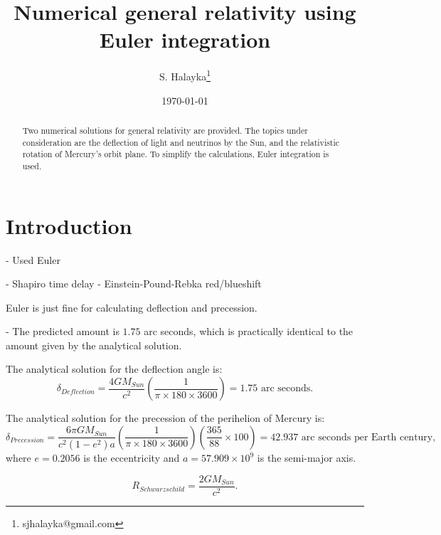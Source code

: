 \documentclass[12pt]{article}
\title{Numerical general relativity using Euler integration}
\author{S. Halayka\footnote{sjhalayka@gmail.com}}
\date{\today\;\currenttime}
\begin{document}
 
\maketitle

\begin{abstract}
Two numerical solutions for general relativity are provided.
The topics under consideration are the deflection of light and neutrinos by the Sun, and the relativistic rotation of Mercury's orbit plane.
To simplify the calculations, Euler integration is used.
\end{abstract}





\section{Introduction}

- Used Euler

- Shapiro time delay
- Einstein-Pound-Rebka red/blueshift







Euler is just fine for calculating deflection and precession.




- The predicted amount is $1.75$ arc seconds, which is practically identical to the amount given by the analytical solution.




The analytical solution for the deflection angle is:
\begin{equation}
\delta_{Deflection} = \frac{4GM_{Sun}}{c^2} \left( \frac{1}{\pi \times 180 \times 3600} \right) = 1.75 \textrm{ arc seconds}.
\end{equation}

The analytical solution for the precession of the perihelion of Mercury is:
\begin{equation}
\delta_{Precession} = \frac{6 \pi GM_{Sun}}{c^2 (1 - e^2) a} \left( \frac{1}{ \pi \times 180 \times 3600} \right) \left( \frac{365}{88} \times 100 \right) = 42.937 \textrm{ arc seconds per Earth century},
\end{equation}
where $e = 0.2056$ is the eccentricity and $a = 57.909 \times 10^9$ is the semi-major axis.



\begin{equation}
R_{Schwarzschild} = \frac{2GM_{Sun}}{c^2}.
\end{equation}
\end{document}
